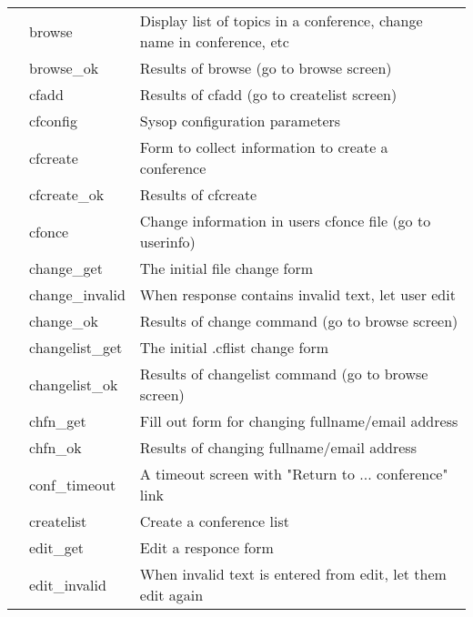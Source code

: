 \documentclass[twoside]{report}
\begin{document}
      \begin{supertabular}{lll}
         & browse
           & Display list of topics in a conference, change name in conference,
            etc \\ 
         & browse\_ok
           & Results of browse (go to browse screen)\\
         & cfadd
           & Results of cfadd (go to createlist screen) \\
         & cfconfig
           & Sysop configuration parameters \\
         & cfcreate
           & Form to collect information to create a conference\\
         & cfcreate\_ok
           & Results of cfcreate \\
         & cfonce
           & Change information in users cfonce file (go to userinfo) \\
         & change\_get
           & The initial file change form \\
         & change\_invalid     
           & When response contains invalid text, let user edit \\
         & change\_ok
           & Results of change command (go to browse screen) \\
         & changelist\_get     
           & The initial .cflist change form \\
         & changelist\_ok
           & Results of changelist command (go to browse screen) \\
         & chfn\_get
           & Fill out form for changing fullname/email address \\
         & chfn\_ok
           & Results of changing fullname/email address \\
         & conf\_timeout
           & A timeout screen with "Return to ... conference" link \\
         & createlist
           & Create a conference list \\
         & edit\_get
           & Edit a responce form \\
         & edit\_invalid
           & When invalid text is entered from edit, let them edit again \\

\end{supertabular}
\end{document}
